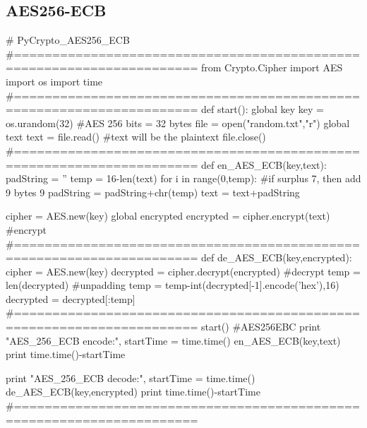 \documentclass{article}
\begin{document}
\subsection{AES256-ECB}
\begin{python}
# PyCrypto_AES256_ECB
#======================================================================
from Crypto.Cipher import AES
import os
import time
#======================================================================
def start():
    global key
    key = os.urandom(32)                    #AES 256 bits = 32 bytes
    file = open("random.txt","r")
    global text                             
    text = file.read()                      #text will be the plaintext
    file.close()
#======================================================================
def en_AES_ECB(key,text):
    padString = ''
    temp = 16-len(text)%
    for i in range(0,temp):           #if surplus 7, then add 9 bytes 9
        padString = padString+chr(temp)
    text = text+padString
    
    cipher = AES.new(key)
    global encrypted 
    encrypted = cipher.encrypt(text)                           #encrypt
#======================================================================
def de_AES_ECB(key,encrypted):
    cipher = AES.new(key)
    decrypted = cipher.decrypt(encrypted)                      #decrypt
    temp = len(decrypted)                                    #unpadding
    temp = temp-int(decrypted[-1].encode('hex'),16)
    decrypted = decrypted[:temp]
#======================================================================
start()
#AES256EBC
print "AES_256_ECB encode:",
startTime = time.time()
en_AES_ECB(key,text)
print time.time()-startTime

print "AES_256_ECB decode:",
startTime = time.time()
de_AES_ECB(key,encrypted)
print time.time()-startTime
#======================================================================
\end{python}
\newpage
\end{document}
